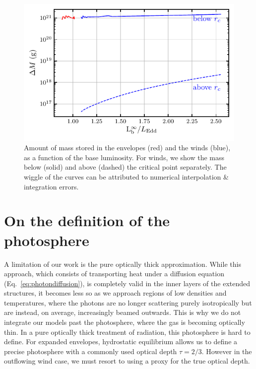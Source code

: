 \documentclass[../main.tex]{subfiles}
\begin{document}
\begin{figure}
    \centering
    \includegraphics{figures/mass_contained.pdf}
    \caption[Mass stored in envelopes and winds]{Amount of mass stored in the envelopes (red) and the winds (blue), as a function of the base luminosity. For winds, we show the mass below (solid) and above (dashed) the critical point separately. The wiggle of the curves can be attributed to numerical interpolation \& integration errors.}
    \label{fig:mass_contained}
\end{figure}

\section{On the definition of the photosphere}\label{sec:compare_photosphere_def}
A limitation of our work is the pure optically thick approximation. While this approach, which consists of transporting heat under a diffusion equation (Eq.~\ref{eq:photondiffusion}), is completely valid in the inner layers of the extended structures, it becomes less so as we approach regions of low densities and temperatures, where the photons are no longer scattering purely isotropically but are instead, on average, increasingly beamed outwards. This is why we do not integrate our models past the photosphere, where the gas is becoming optically thin. In a pure optically thick treatment of radiation, this photosphere is hard to define. For expanded envelopes, hydrostatic equilibrium allows us to define a precise photosphere with a commonly used optical depth $\tau=2/3$. However in the outflowing wind case, we must resort to using a proxy for the true optical depth.  
\end{document}
